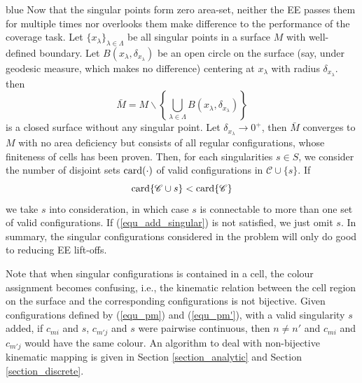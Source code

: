 \documentclass[Afour,sageh,times]{sagej}
\begin{document}
\begin{color}{blue}
Now that the singular points form zero area-set, neither the EE passes them for multiple times nor overlooks them make difference to the performance of the coverage task. 
Let $\{x_\lambda\}_{\lambda\in\Lambda}$ be all singular points in a surface $M$ with well-defined boundary. Let $B(x_\lambda, \delta_{x_\lambda})$ be an open circle on the surface (say, under geodesic measure, which makes no difference) centering at $x_\lambda$ with radius $\delta_{x_\lambda}$. then 
\begin{equation}
\bar{M} = M\backslash \left\{\bigcup\limits_{\lambda\in\Lambda}B(x_\lambda, \delta_{x_\lambda})\right\}
\end{equation}
is a closed surface without any singular point. 
Let $\delta_{x_\lambda}\rightarrow 0^+$, then $\bar{M}$ converges to $M$ with no area deficiency but consists of all regular configurations, whose finiteness of cells has been proven. 
Then, for each singularities $s\in S$, we consider the number of disjoint sets ${\rm card}(\cdot)$ of valid configurations in $\mathscr{C}\cup \{s\}$. If
\begin{equation}\label{equ_add_singular}
{\rm card}\{\mathscr{C} \cup s \} < {\rm card}\{\mathscr{C}\}
\end{equation}
we take $s$ into consideration, in which case $s$ is connectable to more than one set of valid configurations. If (\ref{equ_add_singular}) is not satisfied, we just omit $s$. 
In summary, the singular configurations considered in the problem will only do good to reducing EE lift-offs. 

Note that when singular configurations is contained in a cell, the colour assignment becomes confusing, i.e., the kinematic relation between the cell region on the surface and the corresponding configurations is not bijective. 
Given configurations defined by (\ref{equ_pm}) and (\ref{equ_pm'}), with a valid singularity $s$ added, if $c_{mi}$ and $s$, $c_{m'j}$ and $s$ were pairwise continuous, then $n\neq n'$ and $c_{mi}$ and $c_{m'j}$ would have the same colour. 
An algorithm to deal with non-bijective kinematic mapping is given in Section \ref{section_analytic} and Section \ref{section_discrete}. 

\end{color}
\end{document}
